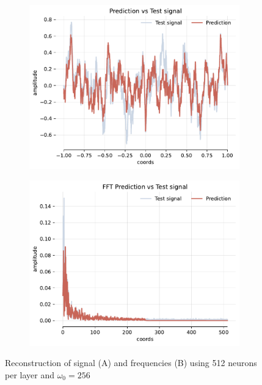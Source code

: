 \begin{figure}[h]
    \centering
    \begin{subfigure}[b]{0.40\textwidth}
        \centering
        \includegraphics[width=\textwidth]{img/ch4/pred-noise-h0-hf512-w256.pdf}
        \caption{}
    \end{subfigure}
    \begin{subfigure}[b]{0.40\textwidth}
        \centering
        \includegraphics[width=\textwidth]{img/ch4/fft-noise-h0-hf512-w256.pdf}
        \caption{}
    \end{subfigure}
    \caption{Reconstruction of signal (A) and frequencies (B) using 512 neurons per layer and $\omega_0=256$}
    \label{f:rec-noise-shallow-hf512-w256}
\end{figure}

